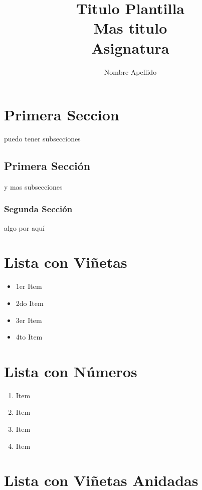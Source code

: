 \documentclass[spanish]{article}
\title{Titulo Plantilla \\ Mas titulo \\ Asignatura}
\author{Nombre Apellido}
\begin{document}

\maketitle

\section{Primera Seccion}
	puedo tener subsecciones
		\subsection{Primera Sección}
		y mas subsecciones	
			\subsubsection{Segunda Sección}
			algo por aquí


\section{Lista con Viñetas}

	 \begin{itemize}
	 
		\item 1er Item 	 
	 	\item 2do Item 	 
	 	\item 3er Item 	 
	 	\item 4to Item 	 
	 \end{itemize}

\section{Lista con Números}

	 \begin{enumerate}
		\item  Item 	 
	 	\item  Item 	 
	 	\item  Item 	 
	 	\item  Item 	 
	 \end{enumerate}

\section{Lista con Viñetas Anidadas}
\end{document}
